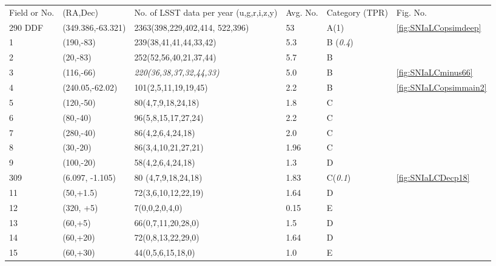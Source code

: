 \begin{center}
\begin{table}
\begin{tabular}{|p{0.7cm} |p{2.8cm}|p{4cm}|p{1.7cm}|p{1.4cm}|p{0.7cm}|}
\hline
 Field or No. & (RA,Dec) & No. of LSST data per year (u,g,r,i,z,y)       & Avg. No.&Category (TPR) &Fig. No. \\
290 DDF  & (349.386,-63.321)  & 2363(398,229,402,414, 522,396) & 53 & A(1)&\ref{fig:SNIaLCopsimdeep}  \\
 1      & (190,-83) &    239(38,41,41,44,33,42) & 5.3 & B ({\it 0.4}) & \\
 2      &(20,-83) & 252(52,56,40,21,37,44)  &5.7  & B  & \\
3      &(116,-66) &  {\it 220(36,38,37,32,44,33)} & 5.0 & B & \ref{fig:SNIaLCminus66} \\
 4      &(240.05,-62.02) &101(2,5,11,19,19,45) & 2.2  & B & \ref{fig:SNIaLCopsimmain2}\\
 5      &(120,-50)  &80(4,7,9,18,24,18)        & 1.8 &  C &\\
 6      & (80,-40)  &      96(5,8,15,17,27,24) &  2.2 & C &\\
 7      & (280,-40) &      86(4,2,6,4,24,18)   &  2.0& C &\\
 8      & (30,-20)  &      86(3,4,10,21,27,21) &  1.96& C & \\
 9      & (100,-20) &      58(4,2,6,4,24,18)   &  1.3& D &\\
 309  & (6.097, -1.105) & 80 (4,7,9,18,24,18)  & 1.83   & C({\it 0.1}) & \ref{fig:SNIaLCDecp18}\\
 11     & (50,+1.5) &      72(3,6,10,12,22,19) &  1.64& D &\\
 12     & (320, +5) &      7(0,0,2,0,4,0)      &  0.15& E &\\
 13     & (60,+5)   &      66(0,7,11,20,28,0)  &  1.5  & D& \\
 14     & (60,+20)  &      72(0,8,13,22,29,0)  &  1.64& D &\\
 15     & (60,+30)  &      44(0,5,6,15,18,0)   &  1.0& E &\\
\hline 
\end{tabular}
\label{tab:lcpositions}
\end{table}
\end{center}

